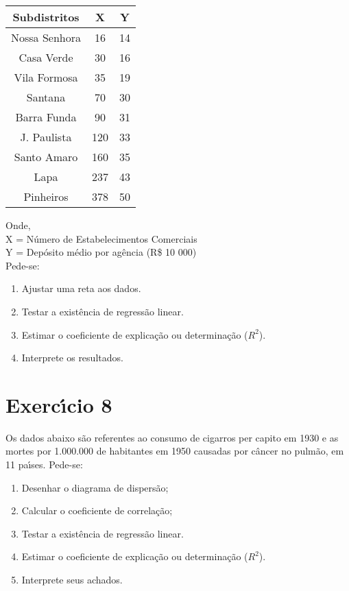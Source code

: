 \documentclass[a4paper,11pt,twoside,openright]{report}
\begin{document}
\begin{center}
\begin{tabular}{|c|c|c|}\hline
Subdistritos & X & Y \\ \hline
Nossa Senhora & 16 & 14 \\ \hline
Casa Verde & 30 & 16 \\ \hline
Vila Formosa & 35 & 19 \\ \hline
Santana & 70 & 30 \\ \hline
Barra Funda & 90 & 31 \\ \hline
J. Paulista & 120 & 33 \\ \hline
Santo Amaro & 160 & 35 \\ \hline
Lapa & 237 & 43 \\ \hline
Pinheiros & 378 & 50 \\ \hline
\end{tabular}
\end{center}

Onde, \\
X = N\'{u}mero de Estabelecimentos Comerciais\\
Y = Dep\'{o}sito m\'{e}dio por ag\^{e}ncia (R\$ 10 000)\\
Pede-se:


\begin{enumerate}
	\item Ajustar uma reta aos dados.
	\item Testar a exist\^{e}ncia de regress\~{a}o linear.
	\item Estimar o coeficiente de explica\c{c}\~{a}o ou determina\c{c}\~{a}o ($R^2$).
	\item Interprete os resultados.
\end{enumerate}

\section*{Exerc\'{\i}cio 8}
\hspace{0.5cm}Os dados abaixo s\~{a}o referentes ao consumo de cigarros per capito em 1930 e as mortes por 1.000.000 de habitantes em 1950 causadas
 por c\^{a}ncer no pulm\~{a}o, em 11 pa\'{\i}ses. Pede-se:

\begin{enumerate}
	\item Desenhar o diagrama de dispers\~{a}o;
	\item Calcular o coeficiente de correla\c{c}\~{a}o;
         \item Testar a exist\^{e}ncia de regress\~{a}o linear.
	\item Estimar o coeficiente de explica\c{c}\~{a}o ou determina\c{c}\~{a}o ($R^2$). 
	\item Interprete seus achados.
\end{enumerate}
\end{document}
